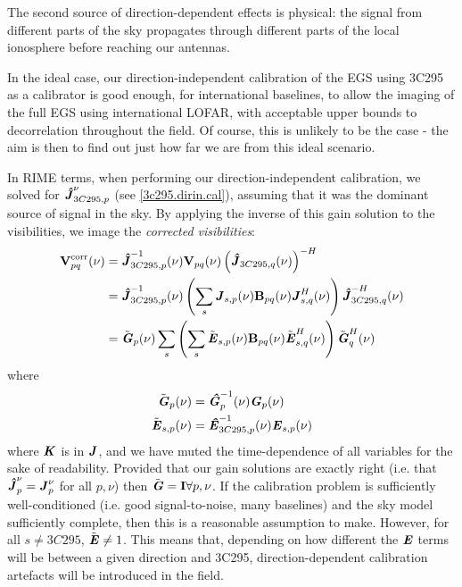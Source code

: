 \pg
The second source of direction-dependent effects is physical: the signal from different parts of the sky propagates through different parts of the local ionosphere before reaching our antennas.

\pg
In the ideal case, our direction-independent calibration of the EGS using 3C295 as a calibrator is good enough, for international baselines, to allow the imaging of the full EGS using international LOFAR, with acceptable upper bounds to decorrelation throughout the field. Of course, this is unlikely to be the case - the aim is then to find out just how far we are from this ideal scenario.

\pg
In RIME terms, when performing our direction-independent calibration, we solved for $\textbf{\emph{\^{J}}}_{3C295,p}^{\nu}$ (see \cref{3c295.dirin.cal}), assuming that it was the dominant source of signal in the sky. By applying the inverse of this gain solution to the visibilities, we image the \textit{corrected visibilities}:
\begin{align}
\textbf{V}_{pq}^\mathrm{corr} (\nu) &= \textbf{\emph{\^{J}}}_{3C295,p}^{-1}(\nu) \textbf{V}_{pq}(\nu) \left(\textbf{\emph{\^{J}}}_{3C295,q}(\nu)\right)^{-H}\\
                        &=  \textbf{\emph{\^{J}}}_{3C295,p}^{-1}(\nu) \left(\sum_s \textbf{\emph{J}}_{s,p}(\nu)\textbf{B}_{pq}(\nu) \textbf{\emph{J}}^H_{s,q}(\nu)\right) \textbf{\emph{\^{J}}}^{-H}_{3C295,q}(\nu)\\
                        &= \tilde{\textbf{\emph{G}}}_{p}(\nu) \sum_s \left( \sum_s \tilde{\textbf{\emph{E}}}_{s,p}(\nu)\textbf{B}_{pq}(\nu) \tilde{\textbf{\emph{E}}}_{s,q}^H(\nu)\right) \tilde{\textbf{\emph{G}}}^H_{q}(\nu)
\end{align}
where
\begin{align}
\tilde{\textbf{\emph{G}}}_{p}(\nu) &= \textbf{\emph{\^{G}}}_{p}^{-1}(\nu)\textbf{\emph{G}}_{p}(\nu)\\
\tilde{\textbf{\emph{E}}}_{s,p}(\nu) &= \textbf{\emph{\^{E}}}_{3C295,p}^{-1}(\nu)\textbf{\emph{E}}_{s,p}(\nu)
\end{align}                        
where $\textbf{\emph{K}}$ is in $\textbf{\emph{J}}$, and we have muted the time-dependence of all variables for the sake of readability. Provided that our gain solutions are exactly right (i.e. that $\textbf{\emph{\^{J}}}_p^{\nu}=\textbf{\emph{J}}_p^{\nu}$ for all $p,\nu$) then $\tilde{\textbf{\emph{G}}}=\bm{\mathrm{I}} \forall p,\nu$. If the calibration problem is sufficiently well-conditioned (i.e. good signal-to-noise, many baselines) and the sky model sufficiently complete, then this is a reasonable assumption to make. However, for all $s\ne 3C295$, $\tilde{\textbf{\emph{E}}}\ne 1$. This means that, depending on how different the $\textbf{\emph{E}}$ terms will be between a given direction and 3C295, direction-dependent calibration artefacts will be introduced in the field. 

